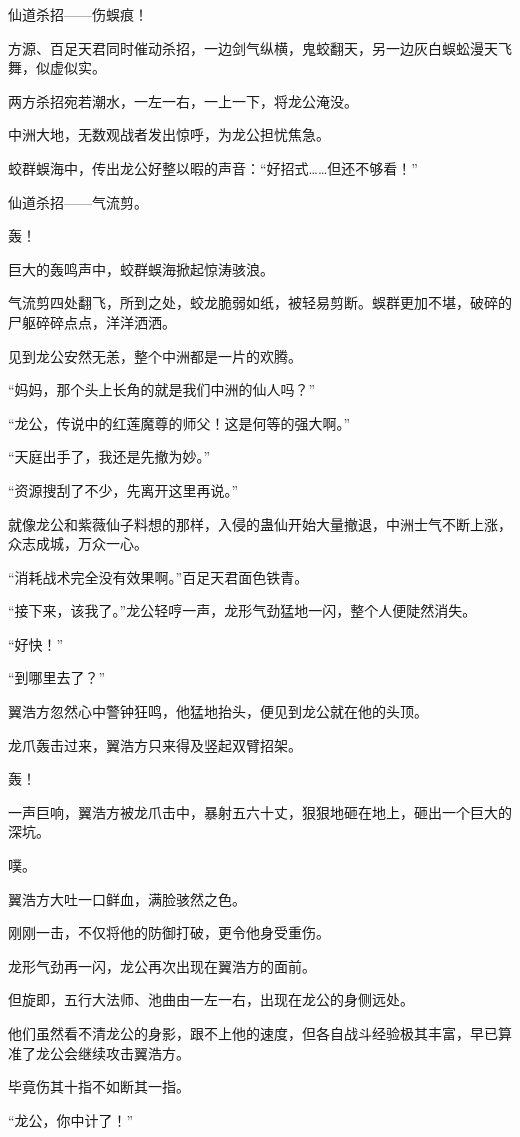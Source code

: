 \begin{this_body}
仙道杀招——伤蜈痕！

方源、百足天君同时催动杀招，一边剑气纵横，鬼蛟翻天，另一边灰白蜈蚣漫天飞舞，似虚似实。

两方杀招宛若潮水，一左一右，一上一下，将龙公淹没。

中洲大地，无数观战者发出惊呼，为龙公担忧焦急。

蛟群蜈海中，传出龙公好整以暇的声音：“好招式……但还不够看！”

仙道杀招——气流剪。

轰！

巨大的轰鸣声中，蛟群蜈海掀起惊涛骇浪。

气流剪四处翻飞，所到之处，蛟龙脆弱如纸，被轻易剪断。蜈群更加不堪，破碎的尸躯碎碎点点，洋洋洒洒。

见到龙公安然无恙，整个中洲都是一片的欢腾。

“妈妈，那个头上长角的就是我们中洲的仙人吗？”

“龙公，传说中的红莲魔尊的师父！这是何等的强大啊。”

“天庭出手了，我还是先撤为妙。”

“资源搜刮了不少，先离开这里再说。”

就像龙公和紫薇仙子料想的那样，入侵的蛊仙开始大量撤退，中洲士气不断上涨，众志成城，万众一心。

“消耗战术完全没有效果啊。”百足天君面色铁青。

“接下来，该我了。”龙公轻哼一声，龙形气劲猛地一闪，整个人便陡然消失。

“好快！”

“到哪里去了？”

翼浩方忽然心中警钟狂鸣，他猛地抬头，便见到龙公就在他的头顶。

龙爪轰击过来，翼浩方只来得及竖起双臂招架。

轰！

一声巨响，翼浩方被龙爪击中，暴射五六十丈，狠狠地砸在地上，砸出一个巨大的深坑。

噗。

翼浩方大吐一口鲜血，满脸骇然之色。

刚刚一击，不仅将他的防御打破，更令他身受重伤。

龙形气劲再一闪，龙公再次出现在翼浩方的面前。

但旋即，五行大法师、池曲由一左一右，出现在龙公的身侧远处。

他们虽然看不清龙公的身影，跟不上他的速度，但各自战斗经验极其丰富，早已算准了龙公会继续攻击翼浩方。

毕竟伤其十指不如断其一指。

“龙公，你中计了！”


\end{this_body}
